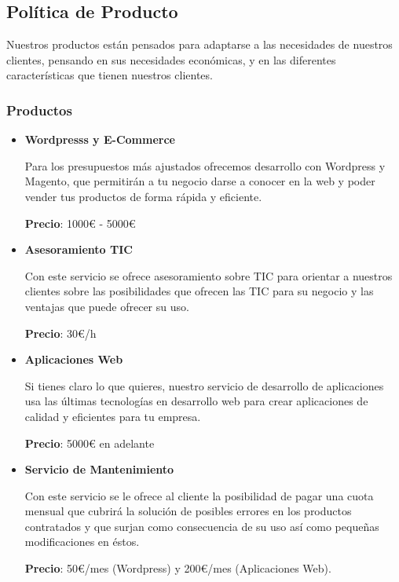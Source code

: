\subsection{Política de Producto}
Nuestros productos están pensados para adaptarse a las necesidades de nuestros clientes, pensando en sus necesidades económicas, y en las diferentes características que tienen nuestros clientes.


\subsubsection{Productos}


\begin{itemize}
    \item \textbf{Wordpresss y E-Commerce}

    Para los presupuestos más ajustados ofrecemos desarrollo con Wordpress y Magento, que permitirán a tu negocio darse a conocer en la web y poder vender tus productos de forma rápida y eficiente.

    \textbf{Precio}: 1000€ - 5000€

    \item \textbf{Asesoramiento TIC}

    Con este servicio se ofrece asesoramiento sobre TIC para orientar a nuestros clientes sobre las posibilidades que ofrecen las TIC para su negocio y las ventajas que puede ofrecer su uso.

    \textbf{Precio}: 30€/h

    \item \textbf{Aplicaciones Web}

    Si tienes claro lo que quieres, nuestro servicio de desarrollo de aplicaciones usa las últimas tecnologías en desarrollo web para crear aplicaciones de calidad y eficientes para tu empresa.

    \textbf{Precio}: 5000€ en adelante

    \item \textbf{Servicio de Mantenimiento}

    Con este servicio se le ofrece al cliente la posibilidad de pagar una cuota mensual que cubrirá la solución de posibles errores en los productos contratados y que surjan como consecuencia de su uso así como pequeñas modificaciones en éstos.

    \textbf{Precio}: 50€/mes (Wordpress) y 200€/mes (Aplicaciones Web).

\end{itemize}



